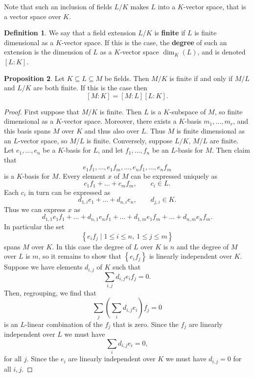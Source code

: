 \documentclass{article}
\newcommand{\rb}[1]{\left( #1 \right)}
\renewcommand{\sb}[1]{\left[ #1 \right]}
\newcommand{\cb}[1]{\left\{ #1 \right\}}
\theoremstyle{definition}\newtheorem{definition}{Definition}[subsection]
\theoremstyle{definition}\newtheorem{remark}[definition]{Remark}
\theoremstyle{definition}\newtheorem*{example}{Example}
\theoremstyle{definition}\newtheorem*{note}{Note}
\newtheorem{proposition}[definition]{Proposition}
\begin{document}
Note that such an inclusion of fields $ L / K $ makes $ L $ into a $ K $-vector space, that is a vector space over $ K $.

\begin{definition}
We say that a field extension $ L / K $ is \textbf{finite} if $ L $ is finite dimensional as a $ K $-vector space. If this is the case, the \textbf{degree} of such an extension is the dimension of $ L $ as a $ K $-vector space $ \dim_K\rb{L} $, and is denoted $ \sb{L : K} $.
\end{definition}

\begin{proposition}
Let $ K \subseteq L \subseteq M $ be fields. Then $ M / K $ is finite if and only if $ M / L $ and $ L / K $ are both finite. If this is the case then
$$ \sb{M : K} = \sb{M : L}\sb{L : K}. $$
\end{proposition}

\begin{proof}
First suppose that $ M / K $ is finite. Then $ L $ is a $ K $-subspace of $ M $, so finite dimensional as a $ K $-vector space. Moreover, there exists a $ K $-basis $ m_1, \dots, m_r $, and this basis spans $ M $ over $ K $ and thus also over $ L $. Thus $ M $ is finite dimensional as an $ L $-vector space, so $ M / L $ is finite. Conversely, suppose $ L / K $, $ M / L $ are finite. Let $ e_1, \dots, e_n $ be a $ K $-basis for $ L $, and let $ f_1, \dots, f_n $ be an $ L $-basis for $ M $. Then claim that
$$ e_1f_1, \dots, e_1f_m, \dots, e_nf_1, \dots, e_nf_m $$
is a $ K $-basis for $ M $. Every element $ x $ of $ M $ can be expressed uniquely as
$$ c_1f_1 + \dots + c_mf_m, \qquad c_i \in L. $$
Each $ c_i $ in turn can be expressed as
$$ d_{1, i}e_1 + \dots + d_{n, i}e_n, \qquad d_{j, i} \in K. $$
Thus we can express $ x $ as
$$ d_{1, 1}e_1f_1 + \dots + d_{n, 1}e_nf_1 + \dots + d_{1, m}e_1f_m + \dots + d_{n, m}e_nf_m. $$
In particular the set
$$ \cb{e_if_j \mid 1 \le i \le n, \ 1 \le j \le m} $$
spans $ M $ over $ K $. In this case the degree of $ L $ over $ K $ is $ n $ and the degree of $ M $ over $ L $ is $ m $, so it remains to show that $ \cb{e_if_j} $ is linearly independent over $ K $. Suppose we have elements $ d_{i, j} $ of $ K $ such that
$$ \sum_{i, j} d_{i, j}e_if_j = 0. $$
Then, regrouping, we find that
$$ \sum_j \rb{\sum_i d_{i, j}e_i}f_j = 0 $$
is an $ L $-linear combination of the $ f_j $ that is zero. Since the $ f_j $ are linearly independent over $ L $ we must have
$$ \sum_i d_{i, j}e_i = 0, $$
for all $ j $. Since the $ e_i $ are linearly independent over $ K $ we must have $ d_{i, j} = 0 $ for all $ i, j $.
\end{proof}
\end{document}
